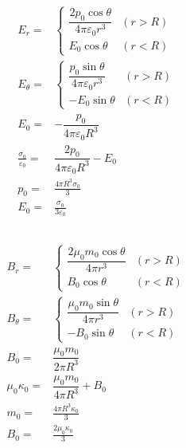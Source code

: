 \documentclass[10pt,fleqn]{article}
\newcommand{\eqar}[1]
{
  \begin{align*}
    #1
  \end{align*}
}
\newcommand{\paren}[1]{{\left({#1}\right)}}
\begin{document}
\section{}
\subsection{}
\eqar{
  E_r=&\left\{
    \begin{array}{ll}
      \dfrac{2p_0\cos\theta}{4\pi\varepsilon_0r^3}&\paren{r>R}\\
      E_0\cos\theta&\paren{r<R}
    \end{array}
  \right.\\
  E_\theta=&\left\{
    \begin{array}{ll}
      \dfrac{p_0\sin\theta}{4\pi\varepsilon_0r^3}&\paren{r>R}\\
      -E_0\sin\theta&\paren{r<R}
    \end{array}
  \right.\\
  E_0=&-\dfrac{p_0}{4\pi\varepsilon_0R^3}\\
  \frac{\sigma_0}{\varepsilon_0}=&\dfrac{2p_0}{4\pi\varepsilon_0R^3}-E_0\\
  p_0=&\frac{4\pi R^3\sigma_0}{3}\\
  E_0=&\frac{\sigma_0}{3\varepsilon_0}
}
\subsection{}
\eqar{
  B_r=&\left\{
    \begin{array}{ll}
      \dfrac{2\mu_0m_0\cos\theta}{4\pi r^3}&\paren{r>R}\\
      B_0\cos\theta&\paren{r<R}
    \end{array}
  \right.\\
  B_\theta=&\left\{
    \begin{array}{ll}
      \dfrac{\mu_0m_0\sin\theta}{4\pi r^3}&\paren{r>R}\\
      -B_0\sin\theta&\paren{r<R}
    \end{array}
  \right.\\
  B_0=&\dfrac{\mu_0m_0}{2\pi R^3}\\
  \mu_0\kappa_0=&\dfrac{\mu_0m_0}{4\pi R^3}+B_0\\
  m_0=&\frac{4\pi R^3\kappa_0}{3}\\
  B_0=&\frac{2\mu_0\kappa_0}{3}
}

\section{}
\end{document}
